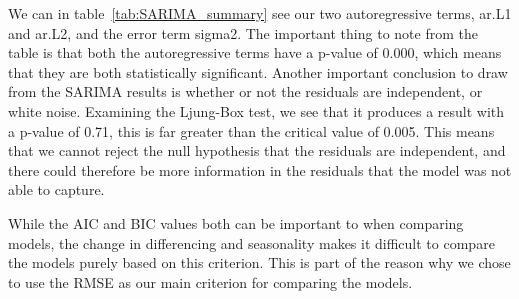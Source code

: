 We can in table~\ref{tab:SARIMA_summary} see our two autoregressive terms, ar.L1 and ar.L2, and the error term sigma2. The important thing to note from the table is that both the autoregressive terms have a p-value of 0.000, which means that they are both statistically significant. Another important conclusion to draw from the SARIMA results is whether or not the residuals are independent, or white noise. Examining the Ljung-Box test, we see that it produces a result with a p-value of 0.71, this is far greater than the critical value of 0.005. This means that we cannot reject the null hypothesis that the residuals are independent, and there could therefore be more information in the residuals that the model was not able to capture. 

While the AIC and BIC values both can be important to when comparing models, the change in differencing and seasonality makes it difficult to compare the models purely based on this criterion. This is part of the reason why we chose to use the RMSE as our main criterion for comparing the models.
